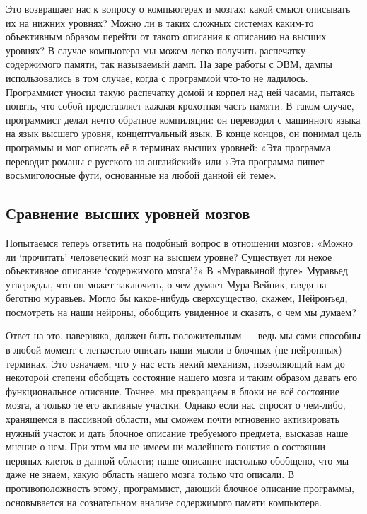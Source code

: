 \documentclass[../main.tex]{subfiles}
\begin{document}
Это возвращает нас к вопросу о компьютерах и мозгах: какой смысл описывать их на нижних уровнях? Можно ли в таких сложных системах каким-то объективным образом перейти от такого описания к описанию на высших уровнях? В случае компьютера мы можем легко получить распечатку содержимого памяти, так называемый дамп. На заре работы с ЭВМ, дампы использовались в том случае, когда с программой что-то не ладилось. Программист уносил такую распечатку домой и корпел над ней часами, пытаясь понять, что собой представляет каждая крохотная часть памяти. В таком случае, программист делал нечто обратное компиляции: он переводил с машинного языка на язык высшего уровня, концептуальный язык. В конце концов, он понимал цель программы и мог описать её в терминах высших уровней: «Эта программа переводит романы с русского на английский» или «Эта программа пишет восьмиголосные фуги, основанные на любой данной ей теме».


\subsection{Сравнение высших уровней мозгов}

Попытаемся теперь ответить на подобный вопрос в отношении мозгов: «Можно ли \enquote*{прочитать} человеческий мозг на высшем уровне? Существует ли некое объективное описание \enquote*{содержимого мозга}?» В «Муравьиной фуге» Муравьед утверждал, что он может заключить, о чем думает Мура Вейник, глядя на беготню муравьев. Могло бы какое-нибудь сверхсущество, скажем, Нейронъед, посмотреть на наши нейроны, обобщить увиденное и сказать, о чем мы думаем?

Ответ на это, наверняка, должен быть положительным --- ведь мы сами способны в любой момент с легкостью описать наши мысли в блочных (не нейронных) терминах. Это означаем, что у нас есть некий механизм, позволяющий нам до некоторой степени обобщать состояние нашего мозга и таким образом давать его функциональное описание. Точнее, мы превращаем в блоки не всё состояние мозга, а только те его активные участки. Однако если нас спросят о чем-либо, хранящемся в пассивной области, мы сможем почти мгновенно активировать нужный участок и дать блочное описание требуемого предмета, высказав наше мнение о нем. При этом мы не имеем ни малейшего понятия о состоянии нервных клеток в данной области; наше описание настолько обобщено, что мы даже не знаем, какую область нашего мозга только что описали. В противоположность этому, программист, дающий блочное описание программы, основывается на сознательном анализе содержимого памяти компьютера.
\end{document}
